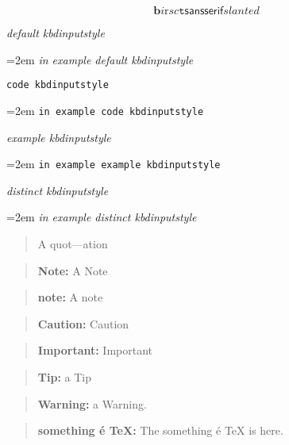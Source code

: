 \documentclass{book}
\begin{document}
$$
\mathbf{b} \mathit{i} \mathrm{r} sc \mathtt{t} \mathsf{sansserif} slanted
$$

{\ttfamily\textsl{default kbdinputstyle}}
\par\begingroup\obeylines\obeyspaces\frenchspacing\leftskip=2em\relax\parskip=0pt\relax\ttfamily{}%
{\ttfamily\textsl{in example default kbdinputstyle}}
\endgroup{}%

\texttt{code kbdinputstyle}
\par\begingroup\obeylines\obeyspaces\frenchspacing\leftskip=2em\relax\parskip=0pt\relax\ttfamily{}%
\texttt{in example code kbdinputstyle}
\endgroup{}%

{\ttfamily\textsl{example kbdinputstyle}}
\par\begingroup\obeylines\obeyspaces\frenchspacing\leftskip=2em\relax\parskip=0pt\relax\ttfamily{}%
\texttt{in example example kbdinputstyle}
\endgroup{}%

{\ttfamily\textsl{distinct kbdinputstyle}}
\par\begingroup\obeylines\obeyspaces\frenchspacing\leftskip=2em\relax\parskip=0pt\relax\ttfamily{}%
{\ttfamily\textsl{in example distinct kbdinputstyle}}
\endgroup{}%

\begin{quote}
A quot---ation
\end{quote}

\begin{quote}
\textbf{Note:} A Note
\end{quote}

\begin{quote}
\textbf{note:} A note
\end{quote}

\begin{quote}
\textbf{Caution:} Caution
\end{quote}

\begin{quote}
\textbf{Important:} Important
\end{quote}

\begin{quote}
\textbf{Tip:} a Tip
\end{quote}

\begin{quote}
\textbf{Warning:} a Warning.
\end{quote}

\begin{quote}
\textbf{something \'{e} \TeX{}:} The something \'{e} \TeX{} is here.
\end{quote}
\end{document}
